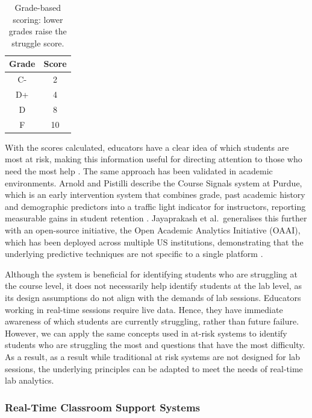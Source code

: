 \begin{table}[H]
    \centering
    \begin{tabular}{|c|c|}
        \hline
        Grade & Score\\
        \hline
        \hline
        C- & 2 \\
        \hline
        D+ & 4\\
        \hline
        D & 8\\
        \hline
        F & 10\\
        \hline
    \end{tabular}
    \caption{Grade-based scoring: lower grades raise the struggle score.}
    \label{tab: grade scoring}
\end{table}
With the scores calculated, educators have a clear idea of which students are most at risk, making this information useful for directing attention to those who need the most help \cite{a2020_atrisk}.
The same approach has been validated in academic environments. Arnold and Pistilli describe the Course Signals system at Purdue, which is an early intervention system that combines grade, past academic history and demographic predictors into a traffic light indicator for instructors, reporting measurable gains in student retention \cite{arnoldCourseSignalsPurdue2012a}.
Jayaprakash et al.\ generalises this further with an open-source initiative, the Open Academic Analytics Initiative (OAAI), which has been deployed across multiple US institutions, demonstrating that the underlying predictive techniques are not specific to a single platform \cite{jayaprakashEarlyAlertAcademically2014}.


Although the system is beneficial for identifying students who are struggling at the course level, it does not necessarily help identify students at the lab level, as its design assumptions do not align with the demands of lab sessions. Educators working in real-time sessions require live data. Hence, they have immediate awareness of which students are currently struggling, rather than future failure. However, we can apply the same concepts used in at-risk systems to identify students who are struggling the most and questions that have the most difficulty. As a result, as a result while traditional at risk systems are not designed for lab sessions, the underlying principles can be adapted to meet the needs of real-time lab analytics.


\subsubsection{Real-Time Classroom Support Systems}

